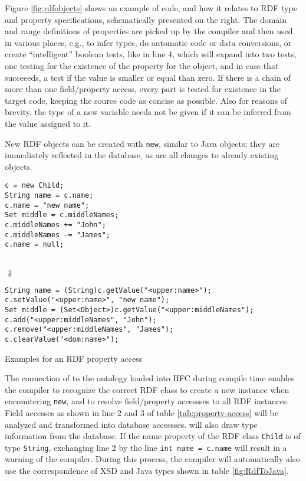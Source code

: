 Figure \ref{fig:rdfobjects} shows an example of \vonda code, and how it relates
to RDF type and property specifications, schematically presented on the right.  The
domain and range definitions of properties are picked up by the compiler and then
used in various places, e.g., to infer types, do automatic code or data
conversions, or create ``intelligent'' boolean tests, like in line 4, which
will expand into two tests, one testing for the existence of the property for
the object, and in case that succeeeds, a test if the value is smaller or equal than
zero. If there is a chain of more than one field/property access, every part is
tested for existence in the target code, keeping the source code as concise as
possible. Also for reasons of brevity, the type of a new variable needs not be
given if it can be inferred from the value assigned to it.

New RDF objects can be created with \texttt{new}, similar to Java objects; they
are immediately reflected in the database, as are all changes to already
existing objects.

\begin{table}[htbp]
  \centering\small
\begin{minipage}[t]{0.355\textwidth}
\begin{lstlisting}
c = new Child;
String name = c.name;
c.name = "new name";
Set middle = c.middleNames;
c.middleNames += "John";
c.middleNames -= "James";
c.name = null;
\end{lstlisting}
\end{minipage}\\{\Large$\Downarrow$}\\
\begin{minipage}[t]{0.8\textwidth}
\begin{lstlisting}
String name = (String)c.getValue("<upper:name>");
c.setValue("<upper:name>", "new name");
Set middle = (Set<Object>)c.getValue("<upper:middleNames");
c.add("<upper:middleNames", "John");
c.remove("<upper:middleNames", "James");
c.clearValue("<dom:name>");
\end{lstlisting}
\end{minipage}
  \caption{Examples for an RDF property access}
  \label{tab:property-access}
\end{table}

The connection of \vonda to the ontology loaded into HFC during compile time
enables the compiler to recognize the correct RDF class to create a new
instance when encountering \texttt{new}, and to resolve field/property
accessses to all RDF instances. Field accesses as shown in line 2 and 3 of
table \ref{tab:property-access} will be analyzed and transformed into database
accessses. \vonda will also draw type information from the database. If the
name property of the RDF class \texttt{Child} is of type \texttt{String},
exchanging line 2 by the line \texttt{int name = c.name} will result in a
warning of the compiler. During this process, the compiler will automatically
also use the correspondence of XSD and Java types shown in table
\ref{fig:RdfToJava}.

